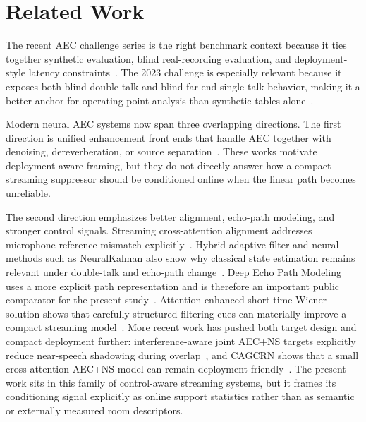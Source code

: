 \documentclass[journal]{IEEEtran}
\begin{document}
\section{Related Work}
The recent AEC challenge series is the right benchmark context because it ties together synthetic evaluation, blind real-recording evaluation, and deployment-style latency constraints~\cite{cutler2021aec,cutler2022aec,cutler2024aec}. The 2023 challenge is especially relevant because it exposes both blind double-talk and blind far-end single-talk behavior, making it a better anchor for operating-point analysis than synthetic tables alone~\cite{cutler2024aec}.

Modern neural AEC systems now span three overlapping directions. The first direction is unified enhancement front ends that handle AEC together with denoising, dereverberation, or source separation~\cite{omalley2022frontend,eskimez2023personalized,ristea2023deepvqe}. These works motivate deployment-aware framing, but they do not directly answer how a compact streaming suppressor should be conditioned online when the linear path becomes unreliable.

The second direction emphasizes better alignment, echo-path modeling, and stronger control signals. Streaming cross-attention alignment addresses microphone-reference mismatch explicitly~\cite{chen2023sca}. Hybrid adaptive-filter and neural methods such as NeuralKalman also show why classical state estimation remains relevant under double-talk and echo-path change~\cite{zhang2023neuralkalman}. Deep Echo Path Modeling uses a more explicit path representation and is therefore an important public comparator for the present study~\cite{zhao2024deepecho}. Attention-enhanced short-time Wiener solution shows that carefully structured filtering cues can materially improve a compact streaming model~\cite{zhao2024astws}. More recent work has pushed both target design and compact deployment further: interference-aware joint AEC+NS targets explicitly reduce near-speech shadowing during overlap~\cite{khanagha2024interference}, and CAGCRN shows that a small cross-attention AEC+NS model can remain deployment-friendly~\cite{wang2025cagcrn}. The present work sits in this family of control-aware streaming systems, but it frames its conditioning signal explicitly as online support statistics rather than as semantic or externally measured room descriptors.
\end{document}
